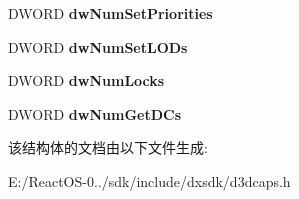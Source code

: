 \begin{DoxyCompactItemize}
D\+W\+O\+RD {\bfseries dw\+Num\+Set\+Priorities}
\item 
\mbox{\label{struct___d3_d_d_e_v_i_n_f_o___t_e_x_t_u_r_i_n_g_a50ced4aa237cd10c13cdc3d45374d87f}} 
D\+W\+O\+RD {\bfseries dw\+Num\+Set\+L\+O\+Ds}
\item 
\mbox{\label{struct___d3_d_d_e_v_i_n_f_o___t_e_x_t_u_r_i_n_g_ab9d4c68501a31d80e3c091a9c20e6963}} 
D\+W\+O\+RD {\bfseries dw\+Num\+Locks}
\item 
\mbox{\label{struct___d3_d_d_e_v_i_n_f_o___t_e_x_t_u_r_i_n_g_ac73a86ad6832467121a1484a318641d6}} 
D\+W\+O\+RD {\bfseries dw\+Num\+Get\+D\+Cs}
\end{DoxyCompactItemize}


该结构体的文档由以下文件生成\+:\begin{DoxyCompactItemize}
\item 
E\+:/\+React\+O\+S-\/0../sdk/include/dxsdk/d3dcaps.\+h\end{DoxyCompactItemize}
